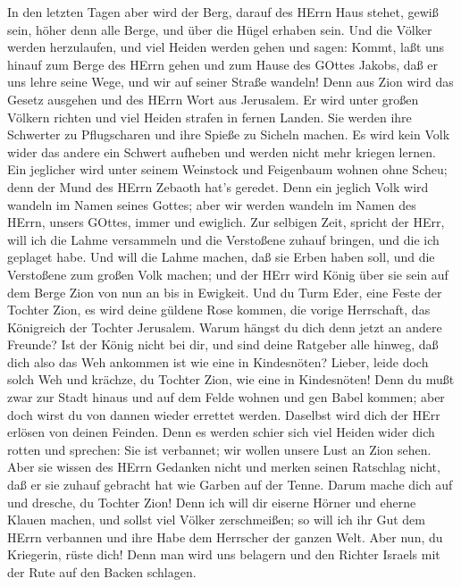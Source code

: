  In den letzten Tagen aber wird der Berg, darauf des HErrn
Haus stehet, gewiß sein, höher denn alle Berge, und über die Hügel
erhaben sein.  Und die Völker werden herzulaufen, und viel
Heiden werden gehen und sagen: Kommt, laßt uns hinauf zum Berge des
HErrn gehen und zum Hause des GOttes Jakobs, daß er uns lehre seine
Wege, und wir auf seiner Straße wandeln! Denn aus Zion wird das Gesetz
ausgehen und des HErrn Wort aus Jerusalem.  Er wird unter
großen Völkern richten und viel Heiden strafen in fernen Landen. Sie
werden ihre Schwerter zu Pflugscharen und ihre Spieße zu Sicheln machen.
Es wird kein Volk wider das andere ein Schwert aufheben und werden nicht
mehr kriegen lernen.  Ein jeglicher wird unter seinem
Weinstock und Feigenbaum wohnen ohne Scheu; denn der Mund des HErrn
Zebaoth hat's geredet.  Denn ein jeglich Volk wird wandeln
im Namen seines Gottes; aber wir werden wandeln im Namen des HErrn,
unsers GOttes, immer und ewiglich.  Zur selbigen Zeit,
spricht der HErr, will ich die Lahme versammeln und die Verstoßene
zuhauf bringen, und die ich geplaget habe.  Und will die
Lahme machen, daß sie Erben haben soll, und die Verstoßene zum großen
Volk machen; und der HErr wird König über sie sein auf dem Berge Zion
von nun an bis in Ewigkeit.  Und du Turm Eder, eine Feste
der Tochter Zion, es wird deine güldene Rose kommen, die vorige
Herrschaft, das Königreich der Tochter Jerusalem.  Warum
hängst du dich denn jetzt an andere Freunde? Ist der König nicht bei
dir, und sind deine Ratgeber alle hinweg, daß dich also das Weh ankommen
ist wie eine in Kindesnöten?  Lieber, leide doch solch Weh
und krächze, du Tochter Zion, wie eine in Kindesnöten! Denn du mußt zwar
zur Stadt hinaus und auf dem Felde wohnen und gen Babel kommen; aber
doch wirst du von dannen wieder errettet werden. Daselbst wird dich der
HErr erlösen von deinen Feinden.  Denn es werden schier
sich viel Heiden wider dich rotten und sprechen: Sie ist verbannet; wir
wollen unsere Lust an Zion sehen.  Aber sie wissen des
HErrn Gedanken nicht und merken seinen Ratschlag nicht, daß er sie
zuhauf gebracht hat wie Garben auf der Tenne.  Darum mache
dich auf und dresche, du Tochter Zion! Denn ich will dir eiserne Hörner
und eherne Klauen machen, und sollst viel Völker zerschmeißen; so will
ich ihr Gut dem HErrn verbannen und ihre Habe dem Herrscher der ganzen
Welt.  Aber nun, du Kriegerin, rüste dich! Denn man wird
uns belagern und den Richter Israels mit der Rute auf den Backen
schlagen.

